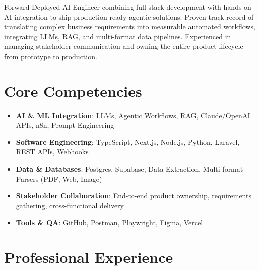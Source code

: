 \documentclass[11pt,a4paper,sans]{moderncv}
\begin{document}
\makecvtitle

Forward Deployed AI Engineer combining full-stack development with hands-on AI integration to ship production-ready agentic solutions. Proven track record of translating complex business requirements into measurable automated workflows, integrating LLMs, RAG, and multi-format data pipelines. Experienced in managing stakeholder communication and owning the entire product lifecycle from prototype to production.

\vspace{3pt}
\section{Core Competencies}
\begin{itemize}
\item \textbf{AI \& ML Integration}: LLMs, Agentic Workflows, RAG, Claude/OpenAI APIs, n8n, Prompt Engineering
\item \textbf{Software Engineering}: TypeScript, Next.js, Node.js, Python, Laravel, REST APIs, Webhooks
\item \textbf{Data \& Databases}: Postgres, Supabase, Data Extraction, Multi-format Parsers (PDF, Web, Image)
\item \textbf{Stakeholder Collaboration}: End-to-end product ownership, requirements gathering, cross-functional delivery
\item \textbf{Tools \& QA}: GitHub, Postman, Playwright, Figma, Vercel
\end{itemize}

\section{Professional Experience}
\end{document}
